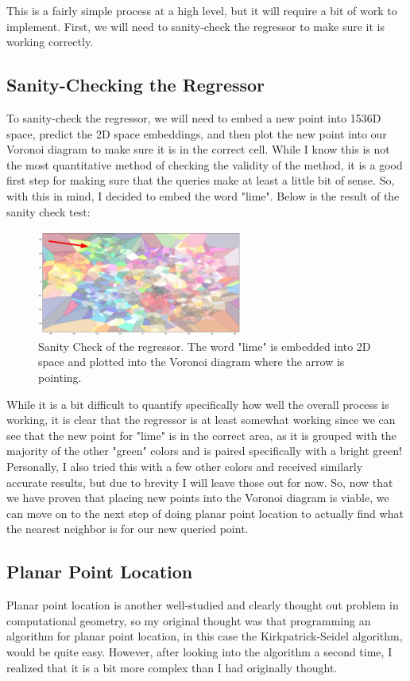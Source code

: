 \documentclass{article}
\begin{document}
\noindent
This is a fairly simple process at a high level, but it will require a bit of work
to implement. First, we will need to sanity-check the regressor to make sure it is
working correctly.

\subsection{Sanity-Checking the Regressor}
To sanity-check the regressor, we will need to embed a new point into 1536D space, predict the 2D space embeddings, and then plot the new point into our Voronoi diagram to make sure it is in the correct cell. While I know this is not the most quantitative method of checking the validity of the method, it is a good first step for making sure that the queries make at least a little bit of sense. So, with this in mind, I decided to embed the word "lime". Below is the result of the sanity check test:

\begin{figure}[H]
\centering
\includegraphics[width=0.6\textwidth]{images/query_sanity_check.png}
\caption{Sanity Check of the regressor. The word "lime" is embedded into 2D space and plotted into the Voronoi diagram where the arrow is pointing.}
\label{fig:sanitycheck}
\end{figure}

\noindent
While it is a bit difficult to quantify specifically how well the overall process is working, it is clear that the regressor is at least somewhat working since we can see that the new point for "lime" is in the correct area, as it is grouped with the majority of the other "green" colors and is paired specifically with a bright green! Personally, I also tried this with a few other colors and received similarly accurate results, but due to brevity I will leave those out for now. So, now that we have proven that placing new points into the Voronoi diagram is viable, we can move on to the next step of doing planar point location to actually find what the nearest neighbor is for our new queried point.

\subsection{Planar Point Location}
Planar point location is another well-studied and clearly thought out problem in computational geometry, so my original thought was that programming an algorithm for planar point location, in this case the Kirkpatrick-Seidel algorithm, would be quite easy. However, after looking into the algorithm a second time, I realized that it is a bit more complex than I had originally thought.
\newline
\end{document}
